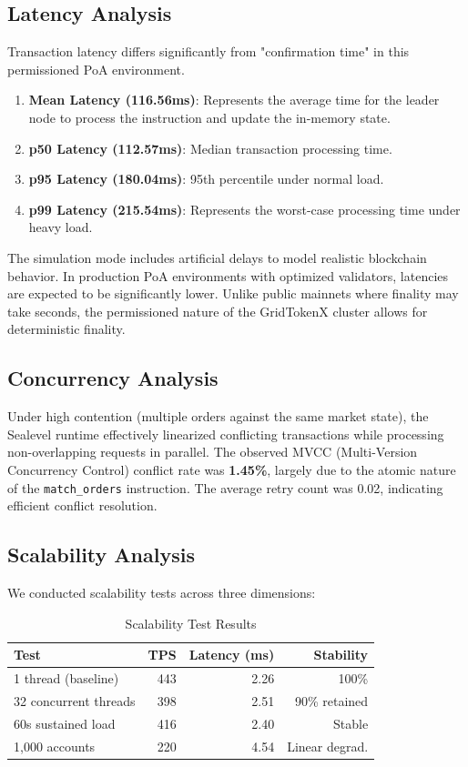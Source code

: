 \documentclass[conference]{IEEEtran}
\begin{document}
{\subsection{Latency Analysis}
Transaction latency differs significantly from "confirmation time" in this permissioned PoA environment.
\begin{enumerate}
    \item \textbf{Mean Latency (116.56ms)}: Represents the average time for the leader node to process the instruction and update the in-memory state.
    \item \textbf{p50 Latency (112.57ms)}: Median transaction processing time.
    \item \textbf{p95 Latency (180.04ms)}: 95th percentile under normal load.
    \item \textbf{p99 Latency (215.54ms)}: Represents the worst-case processing time under heavy load.
\end{enumerate}

The simulation mode includes artificial delays to model realistic blockchain behavior. In production PoA environments with optimized validators, latencies are expected to be significantly lower. Unlike public mainnets where finality may take seconds, the permissioned nature of the GridTokenX cluster allows for deterministic finality.

\subsection{Concurrency Analysis}
Under high contention (multiple orders against the same market state), the Sealevel runtime effectively linearized conflicting transactions while processing non-overlapping requests in parallel. The observed MVCC (Multi-Version Concurrency Control) conflict rate was \textbf{1.45\%}, largely due to the atomic nature of the \texttt{match\_orders} instruction. The average retry count was 0.02, indicating efficient conflict resolution.

\subsection{Scalability Analysis}
We conducted scalability tests across three dimensions:

\begin{table}[htbp]
\caption{Scalability Test Results}
\begin{center}
\begin{tabular}{lrrr}
\toprule
\textbf{Test} & \textbf{TPS} & \textbf{Latency (ms)} & \textbf{Stability} \\
\midrule
1 thread (baseline) & 443 & 2.26 & 100\% \\
32 concurrent threads & 398 & 2.51 & 90\% retained \\
60s sustained load & 416 & 2.40 & Stable \\
1,000 accounts & 220 & 4.54 & Linear degrad. \\
\bottomrule
\end{tabular}
\label{tab:scalability}
\end{center}
\end{table}

}
\end{document}
